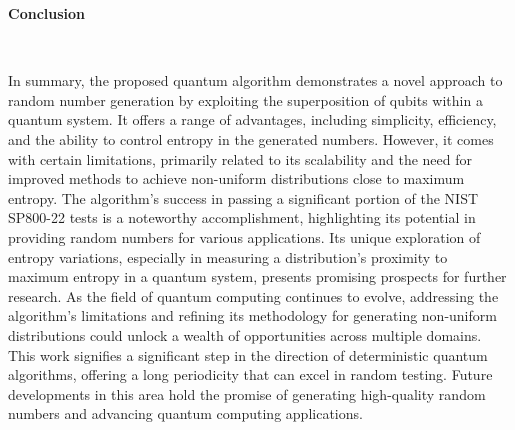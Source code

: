 \documentclass[12pt]{article}
\begin{document}
	   			{\raggedright\large\textbf{Conclusion}}\\\par
	   			{In summary, the proposed quantum algorithm demonstrates a novel approach to random number generation by exploiting the
	   				superposition of qubits within a quantum system. It offers a range of advantages, including simplicity, efficiency, and the ability
	   				to control entropy in the generated numbers. However, it comes with certain limitations, primarily related to its scalability and
	   				the need for improved methods to achieve non-uniform distributions close to maximum entropy.
	   				The algorithm’s success in passing a significant portion of the NIST SP800-22 tests is a noteworthy accomplishment,
	   				highlighting its potential in providing random numbers for various applications. Its unique exploration of entropy variations,
	   				especially in measuring a distribution’s proximity to maximum entropy in a quantum system, presents promising prospects for
	   				further research. As the field of quantum computing continues to evolve, addressing the algorithm’s limitations and refining its methodology
	   				for generating non-uniform distributions could unlock a wealth of opportunities across multiple domains. This work signifies
	   				a significant step in the direction of deterministic quantum algorithms, offering a long periodicity that can excel in random
	   				testing. Future developments in this area hold the promise of generating high-quality random numbers and advancing quantum
	   				computing applications.}
	   			
	   			
\end{document}
